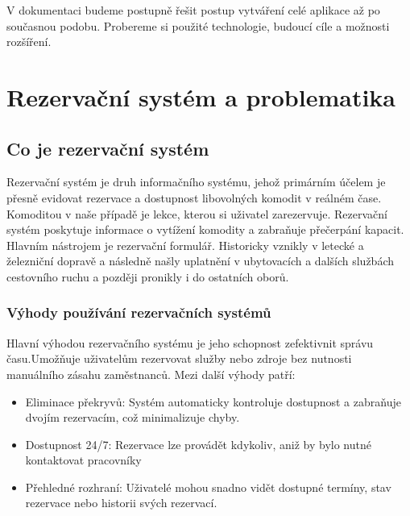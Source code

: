 \documentclass[12pt, a4paper,
openright
]{report}
\begin{document}
 V dokumentaci budeme postupně řešit postup vytváření celé aplikace až po současnou podobu. Probereme si použité technologie, budoucí cíle a možnosti rozšíření.



\chapter{Rezervační systém a problematika}


\section{Co je rezervační systém}
Rezervační systém je druh informačního systému, jehož primárním účelem je přesně evidovat rezervace a dostupnost libovolných komodit v reálném čase. Komoditou v naše případě je lekce, kterou si uživatel zarezervuje. Rezervační systém poskytuje informace o vytížení komodity a zabraňuje přečerpání kapacit. Hlavním nástrojem je rezervační formulář. Historicky vznikly v letecké a železniční dopravě a následně našly uplatnění v ubytovacích a dalších službách cestovního ruchu a později pronikly i do ostatních oborů.

\subsection{Výhody používání rezervačních systémů}
Hlavní výhodou rezervačního systému je jeho schopnost zefektivnit správu času.Umožňuje uživatelům rezervovat služby nebo zdroje bez nutnosti manuálního zásahu zaměstnanců. Mezi další výhody patří:

\begin{itemize}
	\item Eliminace překryvů: Systém automaticky kontroluje dostupnost a zabraňuje dvojím rezervacím, což minimalizuje chyby.
        
	\item Dostupnost 24/7: Rezervace lze provádět kdykoliv, aniž by bylo nutné kontaktovat pracovníky
	\item Přehledné rozhraní: Uživatelé mohou snadno vidět dostupné termíny, stav rezervace nebo historii svých rezervací.
	
\end{itemize}
\clearpage
\end{document}
